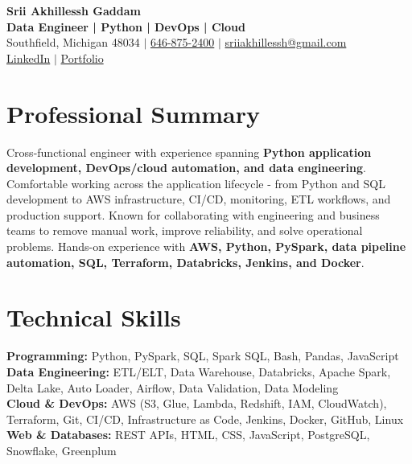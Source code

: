 \documentclass[letterpaper,10pt]{article}
\begin{document}
\fontsize{9.35pt}{10.45pt}\selectfont

\begin{center}
    {\LARGE \textbf{Srii Akhillessh Gaddam}} \\[-1pt]
    \textbf{Data Engineer | Python | DevOps | Cloud} \\[2pt]
    Southfield, Michigan 48034 $|$
    \href{tel:6468752400}{646-875-2400} $|$
    \href{mailto:sriiakhillessh@gmail.com}{sriiakhillessh@gmail.com} \\[1pt]
    \href{https://www.linkedin.com/in/srii-akhiilessh-gaddam-b48668191/}{LinkedIn} $|$
    \href{https://sriiakhillesshg.github.io/portfolio/}{Portfolio}
\end{center}
\vspace{-8pt}

\section{Professional Summary}
\small{Cross-functional engineer with experience spanning \textbf{Python application development, DevOps/cloud automation, and data engineering}. Comfortable working across the application lifecycle - from Python and SQL development to AWS infrastructure, CI/CD, monitoring, ETL workflows, and production support. Known for collaborating with engineering and business teams to remove manual work, improve reliability, and solve operational problems. Hands-on experience with \textbf{AWS, Python, PySpark, data pipeline automation, SQL, Terraform, Databricks, Jenkins, and Docker}.}

\section{Technical Skills}
\small{
\textbf{Programming:} Python, PySpark, SQL, Spark SQL, Bash, Pandas, JavaScript \\
\textbf{Data Engineering:} ETL/ELT, Data Warehouse, Databricks, Apache Spark, Delta Lake, Auto Loader, Airflow, Data Validation, Data Modeling \\
\textbf{Cloud \& DevOps:} AWS (S3, Glue, Lambda, Redshift, IAM, CloudWatch), Terraform, Git, CI/CD, Infrastructure as Code, Jenkins, Docker, GitHub, Linux \\
\textbf{Web \& Databases:} REST APIs, HTML, CSS, JavaScript, PostgreSQL, Snowflake, Greenplum
}
\end{document}
